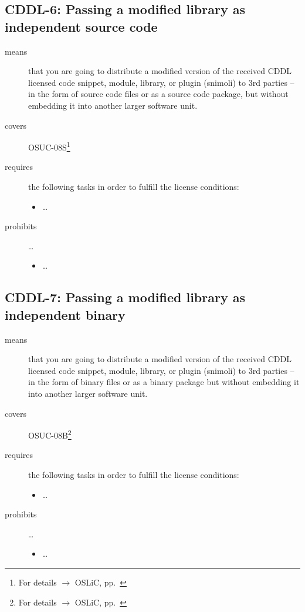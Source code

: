\subsection{CDDL-6: Passing a modified library as independent source code}
\label{OSUC-08S-CDDL}

\begin{description}
\item[means] that you are going to distribute a modified version of the received
CDDL licensed code snippet, module, library, or plugin (snimoli) to 3rd parties
-- in the form of source code files or as a source code package, but without
embedding it into another larger software unit.
\item[covers] OSUC-08S\footnote{For details $\rightarrow$ OSLiC, pp.\
\pageref{OSUC-08S-DEF}}
\item[requires] the following tasks in order to fulfill the license conditions:
\begin{itemize}
  
  \item \ldots
  
\end{itemize}

\item[prohibits] \ldots
\begin{itemize}
  \item \ldots
\end{itemize}
\end{description}

\subsection{CDDL-7: Passing a modified library as independent binary}
\label{OSUC-08B-CDDL}

\begin{description}
\item[means] that you are going to distribute a modified version of the received
CDDL licensed code snippet, module, library, or plugin (snimoli) to 3rd parties
-- in the form of binary files or as a binary package but without embedding it
into another larger software unit.
\item[covers] OSUC-08B\footnote{For details $\rightarrow$ OSLiC, pp.\
\pageref{OSUC-08B-DEF}}
\item[requires] the following tasks in order to fulfill the license conditions:
\begin{itemize}
  
  \item \ldots
  
\end{itemize}

\item[prohibits] \ldots
\begin{itemize}
  \item \ldots
\end{itemize}
\end{description}


